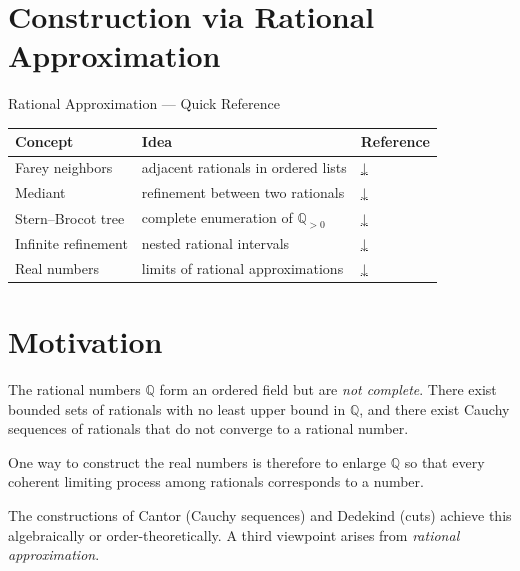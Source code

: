 
\section{Construction via Rational Approximation}

\begin{toolkitbox}{Rational Approximation — Quick Reference}
\small
\begin{tabular}{l l l}
\toprule
\textbf{Concept} & \textbf{Idea} & \textbf{Reference} \\
\midrule
Farey neighbors & adjacent rationals in ordered lists & \hyperref[thm:farey-neighbors]{↓} \\
Mediant & refinement between two rationals & \hyperref[def:mediant]{↓} \\
Stern–Brocot tree & complete enumeration of $\mathbb{Q}_{>0}$ & \hyperref[thm:stern-brocot]{↓} \\
Infinite refinement & nested rational intervals & \hyperref[thm:stern-brocot-limit]{↓} \\
Real numbers & limits of rational approximations & \hyperref[def:real-limit-approx]{↓} \\
\bottomrule
\end{tabular}
\end{toolkitbox}

\section*{Motivation}

\begin{exposition}
The rational numbers $\mathbb{Q}$ form an ordered field but are
\emph{not complete}. There exist bounded sets of rationals with no
least upper bound in $\mathbb{Q}$, and there exist Cauchy sequences
of rationals that do not converge to a rational number.
\end{exposition}

\begin{exposition}
One way to construct the real numbers is therefore to enlarge
$\mathbb{Q}$ so that every coherent limiting process among
rationals corresponds to a number.
\end{exposition}

\begin{exposition}
The constructions of Cantor (Cauchy sequences) and Dedekind
(cuts) achieve this algebraically or order-theoretically.
A third viewpoint arises from \emph{rational approximation}.
\end{exposition}

